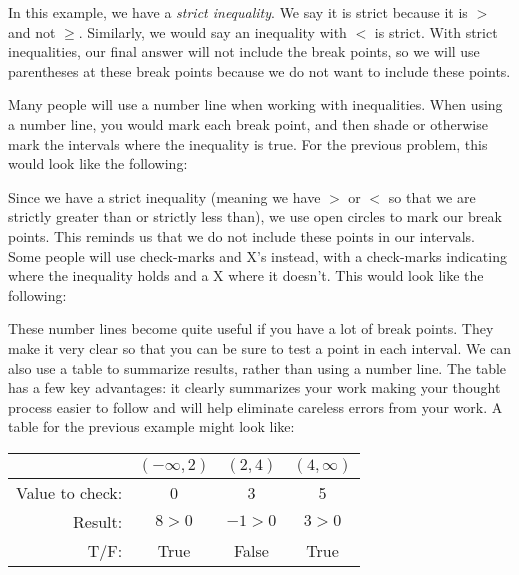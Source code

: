 In this example, we have a \emph{strict inequality}. We say it is strict because it is $>$ and not $\geq$. Similarly, we would say an inequality with $<$ is strict. With strict inequalities, our final answer will not include the break points, so we will use parentheses at these break points because we do not want to include these points.

Many people will use a number line when working with inequalities. When using a number line, you would mark each break point, and then shade or otherwise mark the intervals where the inequality is true. For the previous problem, this would look like the following:

\begin{center}
\label{fig:ineq_num_line1}
\end{center}


\noindent
Since we have a strict inequality (meaning we have $>$ or $<$ so that we are strictly greater than or strictly less than), we use open circles to mark our break points. This reminds us that we do not include these points in our intervals. Some people will use check-marks and X's instead, with a check-marks indicating where the inequality holds and a X where it doesn't. This would look like the following:

\begin{center}
\label{fig:ineq_num_line2}
\end{center}

\noindent
These number lines become quite useful if you have a lot of break points. They make it very clear so that you can be sure to test a point in each interval. We can also use a table to summarize results, rather than using a number line. The table has a few key advantages: it clearly summarizes your work making your thought process easier to follow and will help eliminate careless errors from your work. A table for the previous example might look like:

\begin{tabular}{r |c|c|c}
 & $(-\infty,2)$ & $(2,4)$ & $(4,\infty)$ \\ \hline
Value to check: & 0		& 3	  & 5 \\ \hline
	Result: & $8>0$         & $-1>0$  & $3>0$ \\ \hline
	   T/F: & True          & False   & True
\end{tabular}\\

